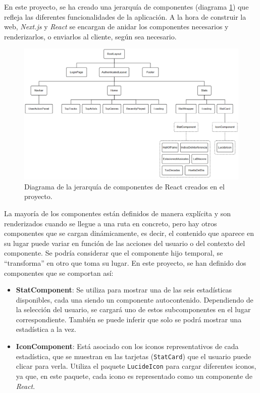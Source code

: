 En este proyecto, se ha creado una jerarquía de componentes (diagrama \ref{fig:componentes_react}) que refleja las diferentes funcionalidades de la aplicación. A la hora de construir la web, \textit{Next.js} y \textit{React} se encargan de anidar los componentes necesarios y renderizarlos, o enviarlos al cliente, según sea necesario.

\begin{figure}[H]
    \centering
    \includegraphics[width=\textwidth]{figures/componentes_react.png}
    \caption{Diagrama de la jerarquía de componentes de React creados en el proyecto.}
    \label{fig:componentes_react}
\end{figure}

La mayoría de los componentes están definidos de manera explícita y son renderizados cuando se llegue a una ruta en concreto, pero hay otros componentes que se cargan dinámicamente, es decir, el contenido que aparece en su lugar puede variar en función de las acciones del usuario o del contexto del componente. Se podría considerar que el componente hijo temporal, se ``transforma'' en otro que toma su lugar. En este proyecto, se han definido dos componentes que se comportan así:

\begin{itemize}
    \item \textbf{StatComponent}: Se utiliza para mostrar una de las seis estadísticas disponibles, cada una siendo un componente autocontenido. Dependiendo de la selección del usuario, se cargará uno de estos subcomponentes en el lugar correspondiente. También se puede inferir que solo se podrá mostrar una estadística a la vez.
    \item \textbf{IconComponent}: Está asociado con los iconos representativos de cada estadística, que se muestran en las tarjetas (\texttt{StatCard}) que el usuario puede clicar para verla. Utiliza el paquete \texttt{LucideIcon} para cargar diferentes iconos, ya que, en este paquete, cada icono es representado como un componente de \textit{React}.
\end{itemize}

